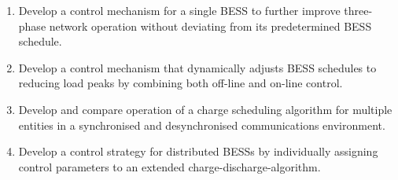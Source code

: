 \begin{enumerate}[
labelindent=*,
style=multiline,
leftmargin=*,
label=\textbf{Objective \arabic*}
]
	\item \label{objective-1} Develop a control mechanism for a single BESS to further improve three-phase network operation without deviating from its predetermined BESS schedule.
	\item \label{objective-2} Develop a control mechanism that dynamically adjusts BESS schedules to reducing load peaks by combining both off-line and on-line control.
	\item \label{objective-3} Develop and compare operation of a charge scheduling algorithm for multiple entities in a synchronised and desynchronised communications environment.
	\item \label{objective-4} Develop a control strategy for distributed BESSs by individually assigning control parameters to an extended charge-discharge-algorithm.
\end{enumerate}

